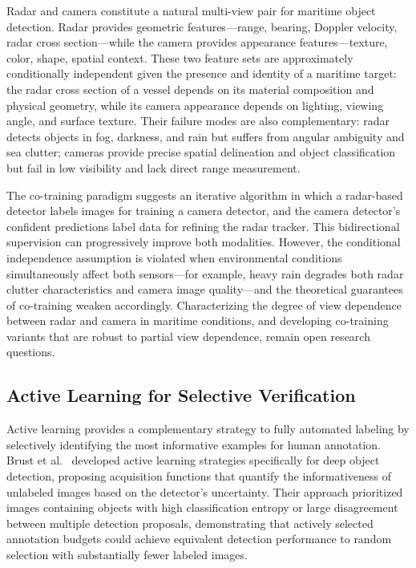 Radar and camera constitute a natural multi-view pair for maritime object detection. Radar provides geometric features---range, bearing, Doppler velocity, radar cross section---while the camera provides appearance features---texture, color, shape, spatial context. These two feature sets are approximately conditionally independent given the presence and identity of a maritime target: the radar cross section of a vessel depends on its material composition and physical geometry, while its camera appearance depends on lighting, viewing angle, and surface texture. Their failure modes are also complementary: radar detects objects in fog, darkness, and rain but suffers from angular ambiguity and sea clutter; cameras provide precise spatial delineation and object classification but fail in low visibility and lack direct range measurement.

The co-training paradigm suggests an iterative algorithm in which a radar-based detector labels images for training a camera detector, and the camera detector's confident predictions label data for refining the radar tracker. This bidirectional supervision can progressively improve both modalities. However, the conditional independence assumption is violated when environmental conditions simultaneously affect both sensors---for example, heavy rain degrades both radar clutter characteristics and camera image quality---and the theoretical guarantees of co-training weaken accordingly. Characterizing the degree of view dependence between radar and camera in maritime conditions, and developing co-training variants that are robust to partial view dependence, remain open research questions.



\subsection{Active Learning for Selective Verification}\label{subsec:active_learning}

Active learning provides a complementary strategy to fully automated labeling by selectively identifying the most informative examples for human annotation. Brust et al.~\cite{brust2018active} developed active learning strategies specifically for deep object detection, proposing acquisition functions that quantify the informativeness of unlabeled images based on the detector's uncertainty. Their approach prioritized images containing objects with high classification entropy or large disagreement between multiple detection proposals, demonstrating that actively selected annotation budgets could achieve equivalent detection performance to random selection with substantially fewer labeled images.

